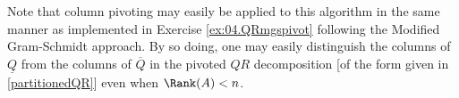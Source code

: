 
\begin{figure*}[t]

\end{figure*}

Note that column pivoting may easily be applied to this algorithm in the same manner as implemented in Exercise \ref{ex:04.QRmgspivot} following the Modified Gram-Schmidt approach.  By so doing, one may easily distinguish
the columns of $\underline{Q}$ from the columns of $\overline{Q}$ in the pivoted $QR$ decomposition [of the form
given in \eqref{partitionedQR}] even when $\Rank(A)<n$. 


